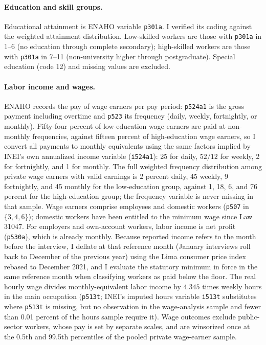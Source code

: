 \paragraph{Education and skill groups.} Educational attainment is ENAHO variable
\texttt{p301a}. I verified its coding against the weighted attainment distribution.
Low-skilled workers are those with \texttt{p301a} in 1--6 (no education through complete
secondary); high-skilled workers are those with \texttt{p301a} in 7--11 (non-university
higher through postgraduate). Special education (code 12) and missing values are excluded.

\paragraph{Labor income and wages.} ENAHO records the pay of wage earners per pay period:
\texttt{p524a1} is the gross payment including overtime and \texttt{p523} its frequency
(daily, weekly, fortnightly, or monthly). Fifty-four percent of low-education wage
earners are paid at non-monthly frequencies, against fifteen percent of high-education
wage earners, so I convert all payments to monthly equivalents using the same factors
implied by INEI's own annualized income variable (\texttt{i524a1}): 25 for daily, $52/12$
for weekly, 2 for fortnightly, and 1 for monthly. The full weighted frequency
distribution among private wage earners with valid earnings is 2 percent daily, 45
weekly, 9 fortnightly, and 45 monthly for the low-education group, against 1, 18, 6,
and 76 percent for the high-education group; the frequency variable is never missing
in that sample. Wage earners comprise employees and
domestic workers (\texttt{p507} in $\{3,4,6\}$); domestic workers have been entitled to
the minimum wage since Law 31047. For employers and own-account workers, labor income is
net profit (\texttt{p530a}), which is already monthly. Because reported income refers to
the month before the interview, I deflate at that reference month (January interviews
roll back to December of the previous year) using the Lima consumer price index
rebased to December 2021, and I evaluate the statutory minimum in force in the same
reference month when classifying workers as paid below the floor. The real hourly wage
divides monthly-equivalent labor income by $4.345$ times weekly hours in the main
occupation (\texttt{p513t}; INEI's imputed hours variable \texttt{i513t} substitutes
where \texttt{p513t} is missing, but no observation in the wage-analysis sample and
fewer than 0.01 percent of the hours sample require it). Wage outcomes exclude public-sector
workers, whose pay is set by separate scales, and are winsorized once at the 0.5th and
99.5th percentiles of the pooled private wage-earner sample.


